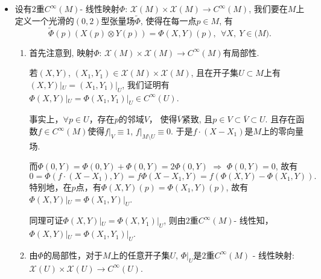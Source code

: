 \begin {itemize}
	
	\item[38.] 
        设有$2$重$C^\infty(M)$- 线性映射$\Phi$: 
        $\mathscr{X}(M)\times \mathscr{X}(M) \rightarrow C^\infty(M)$, 
        我们要在$M$上定义一个光滑的$(0,2)$型张量场$\tilde{\Phi}$, 
        使得在每一点$p\in M$, 有
		$$\tilde{\Phi}(p)(X(p)\otimes Y(p))=\Phi(X,Y)(p),\ \ \forall X,\ Y\in \mathscr(M).$$
		 \begin{enumerate}
	     \item[(1)]
         首先注意到, 映射$\Phi$: $\mathscr{X}(M)\times \mathscr{X}(M) \rightarrow C^\infty(M)$有局部性.\par
		若$(X,Y)$, $(X_1,Y_1)\in \mathscr{X}(M)\times \mathscr{X}(M)$, 
        且在开子集$U\subset M$上有$(X,Y)|_U=(X_1,Y_1)|_U$, 
        我们证明有$\Phi(X,Y)|_U=\Phi(X_1,Y_1)|_U\in C^\infty(U)$.\par
		事实上，$\forall p\in U$，存在$p$的邻域$V$，
        使得$\overline{V}$紧致, 且$p\in V\subset \overline{V}\subset U$. 
        且存在函数$f\in C^\infty(M)$使得$f|_V\equiv 1$, $f|_{M\setminus U}\equiv 0$. 
        于是$f\cdot (X-X_1)$是$M$上的零向量场.\par
		而$\Phi(0,Y)=\Phi(0,Y)+\Phi(0,Y)=2\Phi(0,Y)$ $\Rightarrow$ $\Phi(0,Y)=0$, 故有
			$$0=\Phi(f\cdot(X-X_1),Y)=f\Phi(X-X_1,Y)=f(\Phi(X,Y)-\Phi(X_1,Y)).$$
		特别地，在$p$点，有$\Phi(X,Y)(p)=\Phi(X_1,Y)(p)$, 
        故有$\Phi(X,Y)|_U=\Phi(X_1,Y)|_U$.\par
		同理可证$\Phi(X,Y)|_U=\Phi(X,Y_1)|_U$, 
        则由$2$重$C^\infty(M)$- 线性知，$\Phi(X,Y)|_U=\Phi(X_1,Y_1)|_U$.\par
		
	     \item[(2)]
         由$\Phi$的局部性，对于$M$上的任意开子集$U$, 
         $\Phi|_U$是$2$重$C^\infty(M)$ - 线性映射: 
         $\mathscr{X}(U)\times \mathscr{X}(U) \rightarrow C^\infty(U)$.\par
	

\end{enumerate}
\end{itemize}
